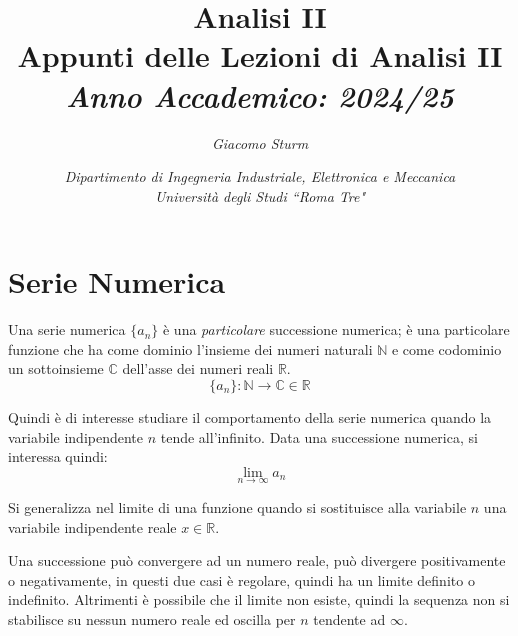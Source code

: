 \documentclass{article}
\numberwithin{equation}{subsection}
\begin{document}
\title{%
    \textbf{Analisi II}  \\ 
    \large Appunti delle Lezioni di Analisi II \\
    \textit{Anno Accademico: 2024/25}}
\author{\textit{Giacomo Sturm}}
\date{\textit{Dipartimento di Ingegneria Industriale, Elettronica e Meccanica \\
Università degli Studi ``Roma Tre"}} 

\maketitle
\thispagestyle{link}

\clearpage


\pagestyle{fancy}
\fancyhead{}\fancyfoot{}
\fancyfoot[C]{\thepage}

\tableofcontents

\clearpage
{}

\section{Serie Numerica}

Una serie numerica $\{a_n\}$ è una \textit{particolare} successione numerica; 
è una particolare funzione che ha come dominio l'insieme dei numeri naturali $\mathbb{N}$ e come codominio un sottoinsieme $\mathbb{C}$ dell'asse dei numeri reali $\mathbb{R}$. 
\begin{equation}
    \{a_n\}:\mathbb{N}\rightarrow\mathbb{C}\in\mathbb{R}
\end{equation}

Quindi è di interesse studiare il comportamento della serie numerica quando la variabile indipendente $n$ tende all'infinito. Data una successione numerica, si interessa quindi:
\begin{equation}
    \lim_{n\to\infty}a_n
\end{equation}

Si generalizza nel limite di una funzione quando si sostituisce alla variabile $n$ una variabile indipendente reale $x\in\mathbb{R}$. 

Una successione può convergere ad un numero reale, può divergere positivamente o negativamente, in questi due casi è regolare, quindi ha un limite definito o indefinito. Altrimenti è possibile che il limite non esiste, quindi la sequenza non si stabilisce su nessun numero reale ed oscilla per $n$ tendente ad $\infty$. 
\end{document}
